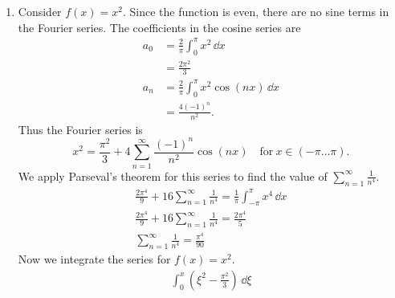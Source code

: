{\begin{Solution}
\begin{enumerate}
\begin{align*}
      b_0 &= \frac{1}{\pi} \int_{-\pi}^\pi x \sin(n x) \,\dd x
      \\
      &= \frac{1}{\pi} \left[ - \frac{1}{n} x \cos(n x) \right]_{-\pi}^\pi 
      + \int_{-\pi}^\pi \frac{1}{n} \cos(n x) \,\dd x
      \\
      &= \frac{2 (-1)^{n+1}}{n}
    \end{align*}
    The Fourier series is
    \[
    x = \sum_{n = 1}^\infty \frac{2 (-1)^{n+1}}{n} \sin(n x) \quad \mathrm{for}\ x \in (-\pi \ldots \pi).
    \]
    We apply Parseval's theorem for this series to find the value of
    $\sum_{n=1}^\infty \frac{1}{n^2}$.
    \begin{gather*}
      \sum_{n = 1}^\infty \frac{4}{n^2} = \frac{1}{\pi} \int_{-\pi}^\pi x^2 \,\dd x
      \\
      \sum_{n = 1}^\infty \frac{4}{n^2} = \frac{2 \pi^2}{3}
      \\
      \boxed{
        \sum_{n=1}^\infty \frac{1}{n^2} = \frac{\pi^2}{6}
        }
    \end{gather*}
  \item  
    Consider $f(x) = x^2$.
    Since the function is even, there are no sine terms in the Fourier series.
    The coefficients in the cosine series are
    \begin{align*}
      a_0 &= \frac{2}{\pi} \int_0^\pi x^2\,\dd x 
      \\
      &= \frac{2 \pi^2}{3} 
      \\
      a_n &= \frac{2}{\pi} \int_0^\pi x^2 \cos(n x)\,\dd x 
      \\
      &= \frac{4(-1)^n}{n^2}.
    \end{align*}
    Thus the Fourier series is
    \[ 
    x^2 = \frac{\pi^2}{3} + 4 \sum_{n=1}^\infty \frac{(-1)^n}{n^2} \cos(n x)
    \quad \mathrm{for}\ x \in (-\pi \ldots \pi).
    \]
    We apply Parseval's theorem for this series to find the value of
    $\sum_{n=1}^\infty \frac{1}{n^4}$.
    \begin{gather*}
      \frac{2 \pi^4}{9} + 16 \sum_{n = 1}^\infty \frac{1}{n^4} = \frac{1}{\pi} \int_{-\pi}^\pi x^4 \,\dd x
      \\
      \frac{2 \pi^4}{9} + 16 \sum_{n = 1}^\infty \frac{1}{n^4} = \frac{2 \pi^4}{5}
      \\
      \boxed{
        \sum_{n=1}^\infty \frac{1}{n^4} = \frac{\pi^4}{90}
        }
    \end{gather*}
    Now we integrate the series for $f(x) = x^2$.
    \begin{gather*}
      \int_0^x \left( \xi^2 - \frac{\pi^2}{3} \right)\,\dd \xi 

\end{gather*}
\end{enumerate}
\end{Solution}}
